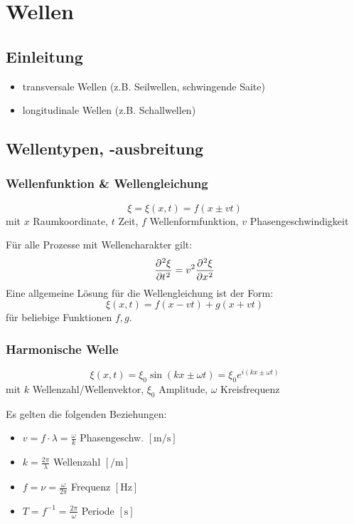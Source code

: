\section{Wellen}

\subsection{Einleitung}
\begin{itemize}
    \item transversale Wellen (z.B. Seilwellen, schwingende Saite)
    \item longitudinale Wellen (z.B. Schallwellen)
\end{itemize}

\subsection{Wellentypen, -ausbreitung}
\subsubsection{Wellenfunktion \& Wellengleichung}\[\xi = \xi(x,t) = f(x \pm vt)\]
mit $x$ Raumkoordinate, $t$ Zeit, $f$ Wellenformfunktion, $v$ Phasengeschwindigkeit

Für alle Prozesse mit Wellencharakter gilt:
$$\diffp[2]\xi t = v^2 \diffp[2]\xi x$$
Eine allgemeine Lösung für die Wellengleichung ist der Form:
$$\xi(x,t) = f(x-vt) + g(x+vt)$$
für beliebige Funktionen $f,g$.

\subsubsection{Harmonische Welle}
\[\xi(x,t) = \xi_0 \sin(kx \pm \omega t) = \xi_0 e^{i(kx\pm \omega t)}\]
mit $k$ Wellenzahl/Wellenvektor, $\xi_0$ Amplitude, $\omega$ Kreisfrequenz

Es gelten die folgenden Beziehungen:
\begin{itemize}
    \item $v = f \cdot \lambda = \frac{\omega}{k}$ \hfill Phasengeschw. $[\si{\meter\per\second}]$
    \item $k = \frac{2\pi}{\lambda}$ \hfill Wellenzahl $[\si{\per\meter}]$
    \item $f = \nu = \frac{\omega}{2\pi}$ \hfill Frequenz $[\si{\hertz}]$
    \item $T = f^{-1} = \frac{2\pi}{\omega}$ \hfill Periode $[\si{\second}]$
\end{itemize}

